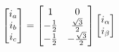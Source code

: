 \begin{equation}
    \centering
    \begin{bmatrix}
        i_{a} \\ 
        i_{b} \\ 
        i_{c}
    \end{bmatrix}
    =
    \begin{bmatrix}
        1 & 0 \\
        - \frac{1}{2} & \frac{\sqrt{3}}{2} \\
        - \frac{1}{2} & - \frac{\sqrt{3}}{2}
    \end{bmatrix}
    \begin{bmatrix}
        i_{\alpha} \\ 
        i_{\beta}
    \end{bmatrix}
    \label{eq:invCtransMatrix}
\end{equation}


